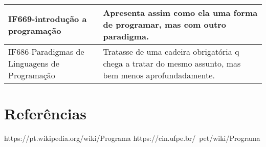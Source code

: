 \documentclass{article}[10pt]
\begin{document}
\begin{table}[!htb]
\begin{tabular}{|l|p{}|}
\hline
IF669-introdução a programação & Apresenta assim como ela uma forma de programar, mas com outro paradigma.
           \\ \hline 
IF686-Paradigmas de Linguagens de Programação & Tratasse de uma cadeira obrigatória q chega a tratar do mesmo assunto, mas bem menos aprofundadamente. 
\\ \hline
\end{tabular}
\end{table}

\section{Referências}

https://pt.wikipedia.org/wiki/Programa%
https://cin.ufpe.br/~pet/wiki/Programa%
\end{document}
